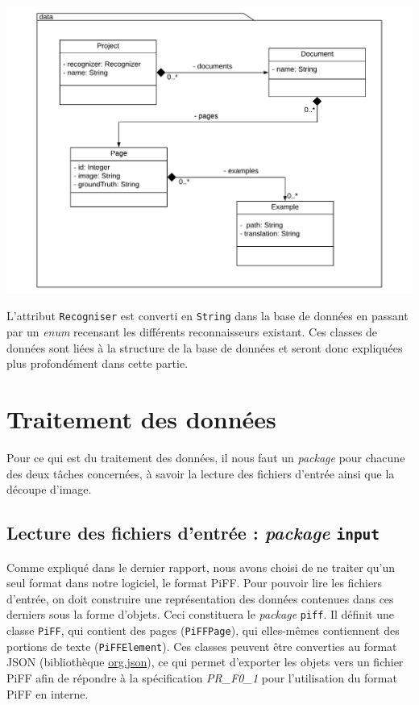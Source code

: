 \begin{mdframed}[frametitle={Structure du package de données}, innerbottommargin=10]
\begin{center}
\includegraphics[scale=0.4]{assets/UML_data.pdf}
\end{center}
\end{mdframed}

L'attribut \texttt{Recogniser} est converti en \texttt{String} dans la base de données en passant par un \textit{enum} recensant les différents reconnaisseurs existant. Ces classes de données sont liées à la structure de la base de données et seront donc expliquées plus profondément dans cette partie.


\section{Traitement des données}

Pour ce qui est du traitement des données, il nous faut un \textit{package} pour chacune des deux tâches concernées, à savoir la lecture des fichiers d'entrée ainsi que la découpe d'image.

\subsection{Lecture des fichiers d'entrée : \textit{package} \texttt{input}}

Comme expliqué dans le dernier rapport, nous avons choisi de ne traiter qu'un seul format dans notre logiciel, le format PiFF. Pour pouvoir lire les fichiers d'entrée, on doit construire une représentation des données contenues dans ces derniers sous la forme d'objets. Ceci constituera le \textit{package} \texttt{piff}. Il définit une classe \texttt{PiFF}, qui contient des pages (\texttt{PiFFPage}), qui elles-mêmes contiennent des portions de texte (\texttt{PiFFElement}). Ces classes peuvent être converties au format JSON (bibliothèque \href{https://mvnrepository.com/artifact/org.json/json}{org.json}), ce qui permet d'exporter les objets vers un fichier PiFF afin de répondre à la spécification \textit{PR\_F0\_1} pour l'utilisation du format PiFF en interne.

